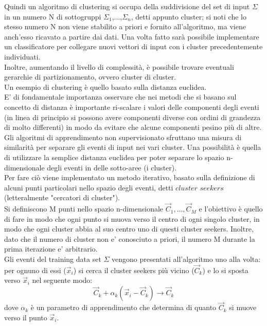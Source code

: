 Quindi un algoritmo di clustering si occupa della suddivisione del set di input $\Sigma$ in un numero N di sottogruppi $\Sigma_1$,...,$\Sigma_n$, detti appunto cluster; si noti che lo stesso numero N non viene stabilito a priori e fornito all'algoritmo, ma viene anch'esso ricavato a partire dai dati. Una volta fatto sarà possibile implementare un classificatore per collegare nuovi vettori di input con i cluster precedentemente individuati.\\
Inoltre, aumentando il livello di complessità, è possibile trovare eventuali gerarchie di partizionamento, ovvero cluster di cluster.\\
Un esempio di clustering è quello basato sulla distanza euclidea. \\
E' di fondamentale importanza osservare che nei metodi che si basano sul concetto di distanza è importante ri-scalare i valori delle componenti degli eventi (in linea di principio si possono avere componenti diverse con ordini di grandezza di molto differenti) in modo da evitare che alcune componenti pesino più di altre. \\
Gli algoritmi di apprendimento non supervisionato sfruttano una misura di similarità per separare gli eventi di input nei vari cluster. Una possibilità è quella di utilizzare la semplice distanza euclidea per poter separare lo spazio n-dimensionale degli eventi in delle sotto-aree (i cluster). \\
Per fare ciò viene implementato un metodo iterativo, basato sulla definizione di alcuni punti particolari nello spazio degli eventi, detti $\textit{cluster seekers}$ (letteralmente "cercatori di cluster"). \\
Si definiscono M punti nello spazio n-dimensionale $\vec{C}_{1},...,\vec{C}_{M}$ e l'obiettivo è quello di fare in modo che ogni punto si muova verso il centro di ogni singolo cluster, in modo che ogni cluster abbia al suo centro uno di questi cluster seekers. Inoltre, dato che il numero di cluster non e' conosciuto a priori, il numero M durante la prima iterazione e' arbitrario. \\
Gli eventi del training data set $\Sigma$ vengono presentati all'algoritmo uno alla volta: per ognuno di essi ($\vec{x}_i$) si cerca il cluster seekers più vicino ($\vec{C}_k$) e lo si sposta verso $\vec{x}_i$ nel seguente modo:
\begin{equation}
\vec{C}_k + \alpha_k(\vec{x}_i - \vec{C}_k) \rightarrow \vec{C}_k
\end{equation}
dove $\alpha_k$ è un parametro di apprendimento che determina di quanto $\vec{C}_k$ si muove verso il punto $\vec{x}_i$. \\
